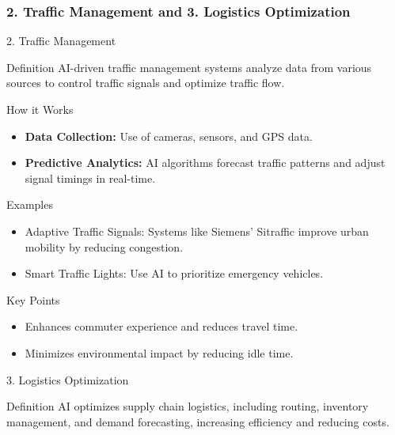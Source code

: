 \documentclass[aspectratio=169]{beamer}
\begin{document}
\begin{frame}[fragile]
    \frametitle{2. Traffic Management and 3. Logistics Optimization}

    \begin{block}{2. Traffic Management}
        \begin{block}{Definition}
            AI-driven traffic management systems analyze data from various sources to control traffic signals and optimize traffic flow.
        \end{block}

        \begin{block}{How it Works}
            \begin{itemize}
                \item \textbf{Data Collection:} Use of cameras, sensors, and GPS data.
                \item \textbf{Predictive Analytics:} AI algorithms forecast traffic patterns and adjust signal timings in real-time.
            \end{itemize}
        \end{block}
        
        \begin{block}{Examples}
            \begin{itemize}
                \item Adaptive Traffic Signals: Systems like Siemens' Sitraffic improve urban mobility by reducing congestion.
                \item Smart Traffic Lights: Use AI to prioritize emergency vehicles.
            \end{itemize}
        \end{block}
        
        \begin{block}{Key Points}
            \begin{itemize}
                \item Enhances commuter experience and reduces travel time.
                \item Minimizes environmental impact by reducing idle time.
            \end{itemize}
        \end{block}
    \end{block}

    \begin{block}{3. Logistics Optimization}
        \begin{block}{Definition}
            AI optimizes supply chain logistics, including routing, inventory management, and demand forecasting, increasing efficiency and reducing costs.
        \end{block}


\end{block}
\end{frame}
\end{document}
